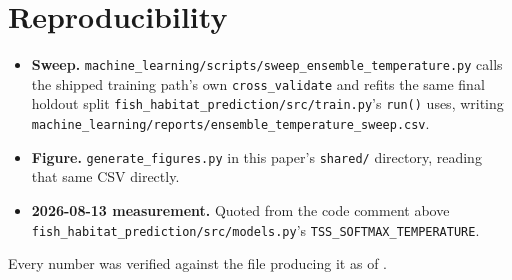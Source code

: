 \documentclass[runningheads]{llncs}
\begin{document}
\section*{Reproducibility}
{\raggedright\sloppy
\begin{itemize}\itemsep1pt\parskip0pt
\item[] \textbf{Sweep.}
\texttt{machine\_learning/scripts/\allowbreak{}sweep\_ensemble\_temperature.py}
calls the shipped training path's own \texttt{cross\_validate} and refits
the same final holdout split
\texttt{fish\_habitat\_prediction/src/\allowbreak{}train.py}'s \texttt{run()}
uses, writing
\texttt{machine\_learning/reports/\allowbreak{}ensemble\_temperature\_sweep.csv}.
\item[] \textbf{Figure.} \texttt{generate\_figures.py} in this paper's
\texttt{shared/} directory, reading that same CSV directly.
\item[] \textbf{2026-08-13 measurement.} Quoted from the code comment above
\texttt{fish\_habitat\_prediction/src/\allowbreak{}models.py}'s
\texttt{TSS\_SOFTMAX\_TEMPERATURE}.
\end{itemize}}
Every number was verified against the file producing it as of \AsOf{}.



\end{document}
